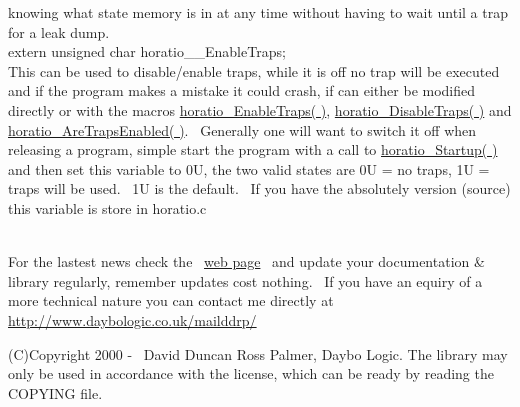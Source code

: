 \documentclass{article}
\begin{document}
knowing
what state memory is in at any time without having to wait until a trap
for a leak dump.
\\
extern unsigned char horatio\_\_EnableTraps;
\\
This can be used to disable/enable traps, while it is off no trap will
be executed and if the program makes a mistake it could crash, if can
either
be modified directly or with the macros \href{#EnableTraps}{horatio\_EnableTraps(
)}, \href{#DisableTraps}{horatio\_DisableTraps( )} and \href{#AreTrapsEnabled}{horatio\_AreTrapsEnabled(
)}.~ Generally one will want to switch it off when releasing a
program, simple start the program with a call to \href{#Startup}{horatio\_Startup(
)} and then set this variable to 0U, the two valid states are 0U =
no
traps, 1U = traps will be used.~ 1U is the default.~ If you
have
the absolutely version (source) this variable is store in horatio.c
\\
~

\par For the lastest news check the~ \href{http://www.daybologic.co.uk/dev/horatio}{web
page}~ and update your documentation \& library regularly,
remember
updates cost nothing.~ If you have an equiry of a more technical
nature
you can contact me directly at \href{http://www.daybologic.co.uk/mailddrp/}{\url{http://www.daybologic.co.uk/mailddrp/}}\href{mailto:palmer@overchat.org}{}


\par (C)Copyright 2000 -
\the\year
~David Duncan Ross Palmer, Daybo Logic. The library may only be used in accordance
with
the license, which can be ready by reading the COPYING file.\\
\end{document}
